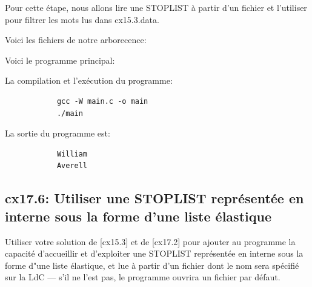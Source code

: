 \documentclass[a4paper,11pt]{article}
\begin{document}
          \bigskip
          \noindent Pour cette étape, nous allons lire une STOPLIST à partir d'un fichier et l'utiliser pour filtrer 
          les mots lus dans cx15.3.data.

          \bigskip
          \noindent Voici les fichiers de notre arborecence:
          
          \begin{figure}[ht]
          \end{figure}

        \noindent Voici le programme principal:
        

        \noindent La compilation et l'exécution du programme:
        \begin{tcolorbox}[colback=lightgray!6, colframe=black, left=-20mm, right=5mm, top=2mm, bottom=-2mm, boxrule=0.1mm]
          \begin{verbatim}
            gcc -W main.c -o main
            ./main
          \end{verbatim}
        \end{tcolorbox}

        \noindent La sortie du programme est: 
        \begin{tcolorbox}[colback=lightgray!6, colframe=black, left=-20mm, right=5mm, top=2mm, bottom=-2mm, boxrule=0.1mm]
          \begin{verbatim}
            William
            Averell
          \end{verbatim}
        \end{tcolorbox}
      
      \newpage
      \subsection{cx17.6: Utiliser une STOPLIST représentée en interne sous la forme d'une liste élastique}

        \noindent Utiliser votre solution de [cx15.3] et de [cx17.2] pour ajouter au programme la capacité
        d'accueillir et d'exploiter une STOPLIST représentée en interne sous la forme d"une liste
        élastique, et lue à partir d'un fichier dont le nom sera spécifié sur la LdC — s'il ne l'est pas,
        le programme ouvrira un fichier par défaut.
        
\end{document}
